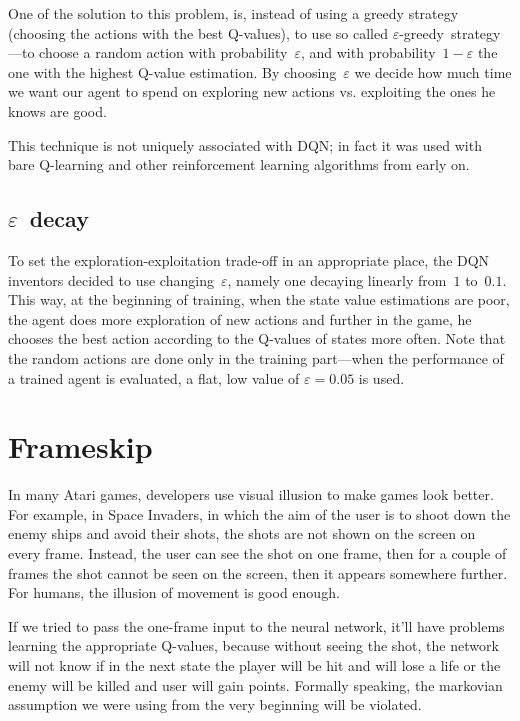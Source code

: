 One of the solution to this problem, is, instead of using a greedy strategy (choosing the actions with the best Q-values), to use so called $\varepsilon$-greedy~strategy---to choose a random action with probability~$\varepsilon$, and with probability~$1 - \varepsilon$ the one with the highest Q-value estimation. By choosing~$\varepsilon$ we decide how much time we want our agent to spend on exploring new actions vs. exploiting the ones he knows are good.

This technique is not uniquely associated with DQN; in fact it was used with bare Q-learning and other reinforcement learning algorithms from early on.

\discussed

\subsection{$\varepsilon$~decay}
To set the exploration-exploitation trade-off in an appropriate place, the DQN inventors decided to use changing~$\varepsilon$, namely one decaying linearly from~$1$ to~$0.1$. This way, at the beginning of training, when the state value estimations are poor, the agent does more exploration of new actions and further in the game, he chooses the best action according to the Q-values of states more often. Note that the random actions are done only in the training part---when the performance of a trained agent is evaluated, a flat, low value of $\varepsilon=0.05$ is used.

\section{Frameskip}\label{dqn-frameskip}
In many Atari games, developers use visual illusion to make games look better. For example, in Space Invaders, in which the aim of the user is to shoot down the enemy ships and avoid their shots, the shots are not shown on the screen on every frame. Instead, the user can see the shot on one frame, then for a couple of frames the shot cannot be seen on the screen, then it appears somewhere further. For humans, the illusion of movement is good enough.

If we tried to pass the one-frame input to the neural network, it'll have problems learning the appropriate Q-values, because without seeing the shot, the network will not know if in the next state the player will be hit and will lose a life or the enemy will be killed and user will gain points. Formally speaking, the markovian assumption we were using from the very beginning will be violated.

